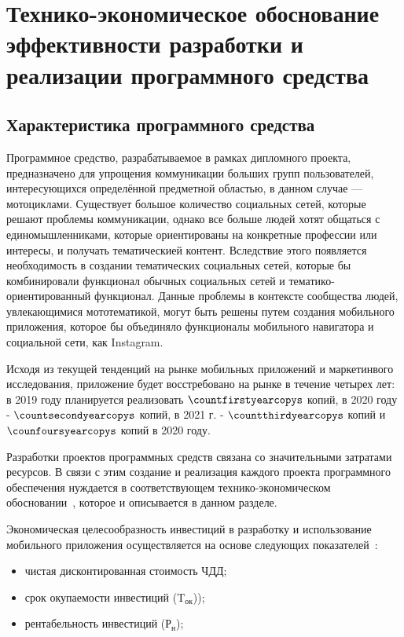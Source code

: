 


\section{Технико-экономическое обоснование эффективности разработки и реализации программного средства}
\label{sec:economics}

\subsection{Характеристика программного средства}
\label{sec:economics:description}

Программное средство, разрабатываемое в рамках дипломного проекта, предназначено для упрощения коммуникации больших групп пользователей, интересующихся определённой предметной областью, в данном случае --- мотоциклами.
Существует большое количество социальных сетей, которые решают проблемы коммуникации, однако все больше людей хотят общаться с единомышленниками, которые ориентированы на конкретные профессии или интересы, и получать тематическией контент.
Вследствие этого появляется необходимость в создании тематических социальных сетей, которые бы комбинировали функционал обычных социальных сетей и тематико-ориентированный функционал.
Данные проблемы в контексте сообщества людей, увлекающимися мототематикой, могут быть решены путем создания мобильного приложения, которое бы объединяло функционалы мобильного навигатора и социальной сети, как Instagram.

Исходя из текущей тенденций на рынке мобильных приложений и маркетинвого исследования, приложение будет восстребовано на рынке в течение четырех лет:
в 2019 году планируется реализовать $ \countfirstyearcopys $ копий, в 2020 году - $ \countsecondyearcopys $ копий, в 2021 г. - $ \countthirdyearcopys $ копий и $ \counfoursyearcopys $ копий в 2020 году.

Разработки проектов программных средств связана со значительными затратами ресурсов. В связи с этим создание и реализация каждого проекта программного обеспечения нуждается в соответствующем тех\-ни\-ко-эко\-но\-ми\-чес\-ком обосновании~\cite{palitsyn}, которое и описывается в данном разделе.

Экономическая целесообразность инвестиций в разработку и использование мобильного приложения осуществляется на основе следующих показателей~\cite{nosenko}:
\begin{itemize}
	\item чистая дисконтированная стоимость ЧДД;
	\item срок окупаемости инвестиций ($ \text{T}_\text{ок} $));
	\item рентабельность инвестиций ($ \text{Р}_\text{н} $);
\end{itemize}

